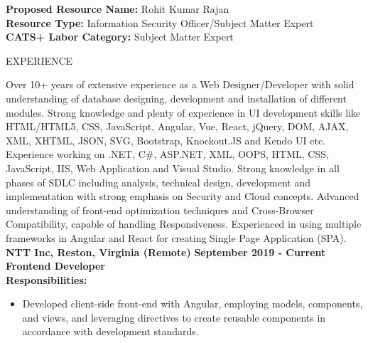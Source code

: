 \documentclass{resume} %
\begin{document}
\begin{flushleft}
    \textbf{Proposed Resource Name:} Rohit Kumar Rajan \\
    \textbf{Resource Type:} Information Security Officer/Subject Matter Expert \\
    \textbf{CATS+ Labor Category:} Subject Matter Expert
\end{flushleft}

\vspace{1.3em}

\begin{rSection}{EXPERIENCE}
        \begin{flushleft}
        Over 10+ years of extensive experience as a Web Designer/Developer with solid understanding of database designing, development and installation of different modules. Strong knowledge and plenty of experience in UI development skills like HTML/HTML5, CSS, JavaScript, Angular, Vue, React, jQuery, DOM, AJAX, XML, XHTML, JSON, SVG, Bootstrap, Knockout.JS and Kendo UI etc. Experience working on .NET, C\#, ASP.NET, XML, OOPS, HTML, CSS, JavaScript, IIS, Web Application and Visual Studio. Strong knowledge in all phases of SDLC including analysis, technical design, development and implementation with strong emphasis on Security and Cloud concepts. Advanced understanding of front{-}end optimization techniques and Cross{-}Browser Compatibility, capable of handling Responsiveness. Experienced in using multiple frameworks in Angular and React for creating Single Page Application (SPA). \\
        \vspace{1em} 
            \textbf{NTT Inc, Reston, Virginia (Remote)} \hfill \textbf{September 2019 {-} Current} \\
            \textbf{Frontend Developer} \\
            \vspace{1em}
            \textbf{Responsibilities:} \\
            \begin{itemize}
                                    \item Developed client{-}side front{-}end with Angular, employing models, components, and views, and leveraging directives to create reusable components in accordance with development standards.

\end{itemize}
\end{flushleft}
\end{rSection}
\end{document}
